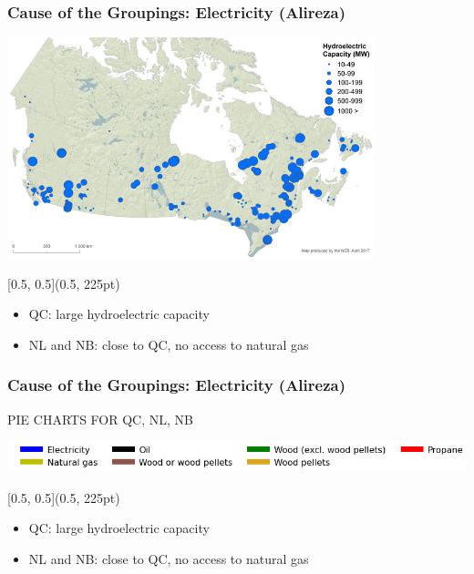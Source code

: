 \documentclass{beamer}
\begin{document}
\begin{frame}
\frametitle{Cause of the Groupings: Electricity (Alireza)}
\vspace{-30pt}
\begin{center}
\includegraphics[width=0.8\textwidth]{hydroPower.jpg}
\end{center}

\begin{textblock*}{\textwidth}[0.5, 0.5](0.5\linewidth, 225pt)
\begin{itemize}
	\item QC: large hydroelectric capacity
	\item  NL and NB: close to QC, no access to natural gas  
\end{itemize}
\end{textblock*}
\end{frame}




\begin{frame}
\frametitle{Cause of the Groupings: Electricity (Alireza)}

{\Huge PIE CHARTS FOR QC, NL, NB}

\begin{center}
\includegraphics[width=0.8\linewidth]{leg_bar.png}
\end{center}


\begin{textblock*}{\textwidth}[0.5, 0.5](0.5\linewidth, 225pt)
\begin{itemize}
	\item QC: large hydroelectric capacity
	\item  NL and NB: close to QC, no access to natural gas  
\end{itemize}
\end{textblock*}
\end{frame}
\end{document}

